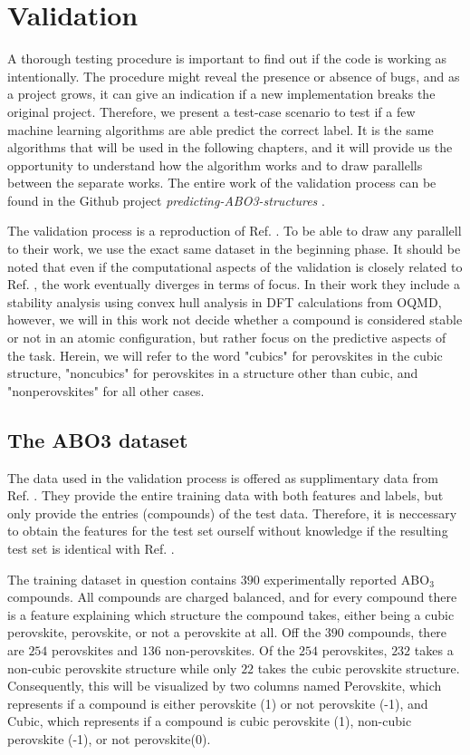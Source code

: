 \chapter{Validation}

A thorough testing procedure is important to find out if the code is working as intentionally. The procedure might reveal the presence or absence of bugs, and as a project grows, it can give an indication if a new implementation breaks the original project. Therefore, we present a test-case scenario to test if a few machine learning algorithms are able predict the correct label. It is the same algorithms that will be used in the following chapters, and it will provide us the opportunity to understand how the algorithm works and to draw parallells between the separate works. The entire work of the validation process can be found in the Github project \textit{predicting-ABO3-structures} \cite{Ohebbi2021a}.

The validation process is a reproduction of Ref. \cite{Balachandran2018}. To be able to draw any parallell to their work, we use the exact same dataset in the beginning phase. It should be noted that even if the computational aspects of the validation is closely related to Ref. \cite{Balachandran2018}, the work eventually diverges in terms of focus. In their work they include a stability analysis using convex hull analysis in DFT calculations from OQMD, however, we will in this work not decide whether a compound is considered stable or not in an atomic configuration, but rather focus on the predictive aspects of the task. Herein, we will refer to the word "cubics" for perovskites in the cubic structure, "noncubics" for perovskites in a structure other than cubic, and "nonperovskites" for all other cases.

\section{The ABO3 dataset}

The data used in the validation process is offered as supplimentary data from Ref. \cite{Balachandran2018}. They provide the entire training data with both features and labels, but only provide the entries (compounds) of the test data. Therefore, it is neccessary to obtain the features for the test set ourself without knowledge if the resulting test set is identical with Ref. \cite{Balachandran2018}.

The training dataset in question contains $390$ experimentally reported ABO$_3$ compounds. All compounds are charged balanced, and for every compound there is a feature explaining which structure the compound takes, either being a cubic perovskite, perovskite, or not a perovskite at all. Off the $390$ compounds, there are $254$ perovskites and $136$ non-perovskites. Of the $254$ perovskites, $232$ takes a non-cubic perovskite structure while only $22$ takes the cubic perovskite structure. Consequently, this will be visualized by two columns named Perovskite, which represents if a compound is either perovskite (1) or not perovskite (-1), and Cubic, which represents if a compound is cubic perovskite (1), non-cubic perovskite (-1), or not perovskite(0).

